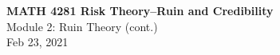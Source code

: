 \documentclass[11pt]{beamer}
\begin{document}
\begin{frame}
  \frametitle{}
  \begin{center}
    \textbf{\large MATH 4281 Risk Theory--Ruin and Credibility}\\
    \vspace{1cm}
    {\large  Module 2: Ruin Theory (cont.) } \\
    \vspace{1cm}
    {\large  Feb 23, 2021}
    \end{center}
    \vspace{1cm}
\end{frame}
\begin{frame}
\tableofcontents
\end{frame}
\end{document}
